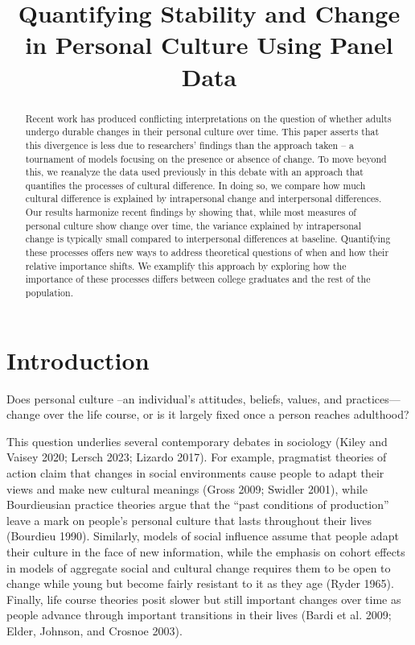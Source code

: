 \documentclass[
  12pt,
]{article}
\title{Quantifying Stability and Change in Personal Culture Using Panel
Data}
\author{}
\date{\vspace{-2.5em}}
\begin{document}
\maketitle
\begin{abstract}
Recent work has produced conflicting interpretations on the question of
whether adults undergo durable changes in their personal culture over
time. This paper asserts that this divergence is less due to
researchers' findings than the approach taken -- a tournament of models
focusing on the presence or absence of change. To move beyond this, we
reanalyze the data used previously in this debate with an approach that
quantifies the processes of cultural difference. In doing so, we compare
how much cultural difference is explained by intrapersonal change and
interpersonal differences. Our results harmonize recent findings by
showing that, while most measures of personal culture show change over
time, the variance explained by intrapersonal change is typically small
compared to interpersonal differences at baseline. Quantifying these
processes offers new ways to address theoretical questions of when and
how their relative importance shifts. We examplify this approach by
exploring how the importance of these processes differs between college
graduates and the rest of the population.
\end{abstract}

\hypertarget{introduction}{%
\section{Introduction}\label{introduction}}

Does personal culture --an individual's attitudes, beliefs, values, and
practices--- change over the life course, or is it largely fixed once a
person reaches adulthood?

This question underlies several contemporary debates in sociology (Kiley
and Vaisey 2020; Lersch 2023; Lizardo 2017). For example, pragmatist
theories of action claim that changes in social environments cause
people to adapt their views and make new cultural meanings (Gross 2009;
Swidler 2001), while Bourdieusian practice theories argue that the
``past conditions of production'' leave a mark on people's personal
culture that lasts throughout their lives (Bourdieu 1990). Similarly,
models of social influence assume that people adapt their culture in the
face of new information, while the emphasis on cohort effects in models
of aggregate social and cultural change requires them to be open to
change while young but become fairly resistant to it as they age (Ryder
1965). Finally, life course theories posit slower but still important
changes over time as people advance through important transitions in
their lives (Bardi et al. 2009; Elder, Johnson, and Crosnoe 2003).
\end{document}
